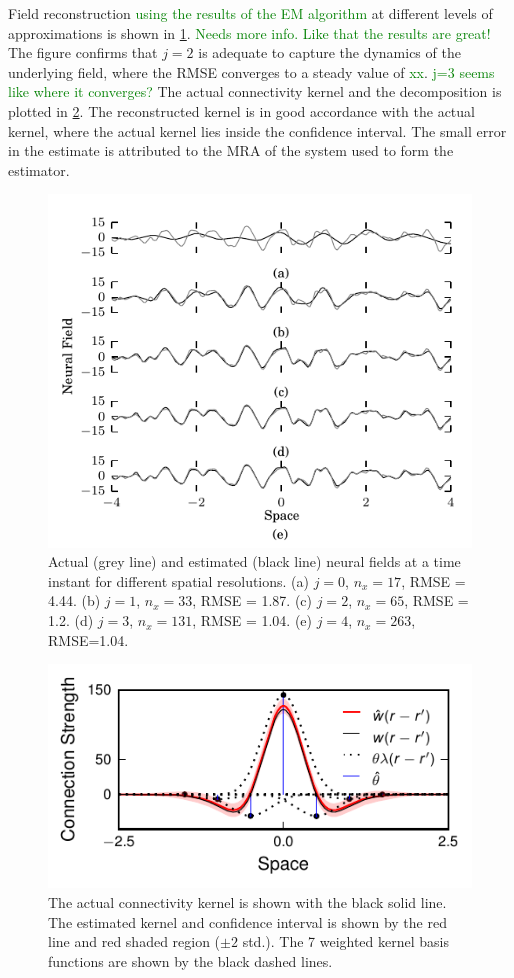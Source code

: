 \documentclass[journal,a4paper]{IEEEtran}
\newcommand{\dean}[1]{\textcolor{green}{#1}}
\begin{document}
Field reconstruction \dean{using the results of the EM algorithm} at different levels of approximations is shown in \figurename{\ref{fig:FieldEstimates}}. \dean{Needs more info. Like that the results are great!} The figure confirms that $j=2$ is adequate to capture the dynamics of the underlying field, where the RMSE converges to a steady value of \dean{xx}. \dean{j=3 seems like where it converges?} The actual connectivity kernel and the decomposition is plotted in \figurename{\ref{fig:KernelEstimate}}. The reconstructed kernel is in good accordance with the actual kernel, where the actual kernel lies inside the confidence interval. The small error in the estimate is attributed to the MRA of the system used to form the estimator.
\begin{figure}[!h] 
	\centering
		\includegraphics[scale=1]{./Graph/Field.pdf}
		\caption{Actual (grey line) and estimated (black line) neural fields at a time instant for different spatial resolutions. (a) $j=0$, $n_x=17$, RMSE = 4.44. (b) $j=1$, $n_x=33$, RMSE = 1.87. (c) $j=2$, $n_x=65$, RMSE = 1.2. (d) $j=3$, $n_x=131$, RMSE = 1.04. (e) $j=4$, $n_x=263$, RMSE=1.04.}
	\label{fig:FieldEstimates}
\end{figure} 
\begin{figure}[!h] 
	\centering
		\includegraphics[scale=1]{./Graph/Kernel.pdf}
		\caption{The actual connectivity kernel is shown with the black solid line. The estimated kernel and confidence interval is shown by the red line and red shaded region ($\pm2$ std.). The 7 weighted kernel basis functions are shown by the black dashed lines.}
	\label{fig:KernelEstimate}
\end{figure}
\end{document}
